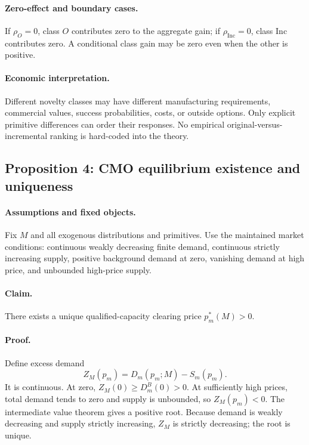 \paragraph{Zero-effect and boundary cases.}
If \(\rho_O=0\), class \(O\) contributes zero to the aggregate gain; if
\(\rho_{\mathrm{Inc}}=0\), class \(\mathrm{Inc}\) contributes zero. A
conditional class gain may be zero even when the other is positive.

\paragraph{Economic interpretation.}
Different novelty classes may have different manufacturing requirements,
commercial values, success probabilities, costs, or outside options. Only
explicit primitive differences can order their responses. No empirical
original-versus-incremental ranking is hard-coded into the theory.

\subsection{Proposition 4: CMO equilibrium existence and uniqueness}
\label{prop:p08-cmo-existence}

\paragraph{Assumptions and fixed objects.}
Fix \(M\) and all exogenous distributions and primitives. Use the maintained
market conditions: continuous weakly decreasing finite demand, continuous strictly
increasing supply, positive background demand at zero, vanishing demand at
high price, and unbounded high-price supply.

\paragraph{Claim.}
There exists a unique qualified-capacity clearing price
\(p_m^*(M)>0\).

\paragraph{Proof.}
Define excess demand
\begin{equation}
  Z_M(p_m)
  =
  D_m(p_m;M)-S_m(p_m).
  \label{eq:p08-excess-demand}
\end{equation}
It is continuous. At zero,
\(Z_M(0)\geq D_m^B(0)>0\). At sufficiently high prices, total demand tends to
zero and supply is unbounded, so \(Z_M(p_m)<0\). The intermediate value
theorem gives a positive root. Because demand is weakly decreasing and supply
strictly increasing, \(Z_M\) is strictly decreasing; the root is unique.


